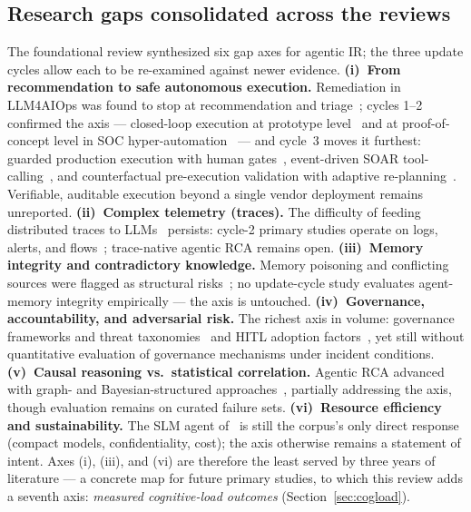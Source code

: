 \documentclass{ieeeaccess}
\begin{document}
\subsection{Research gaps consolidated across the reviews}
\label{sec:gapaxes}
The foundational review synthesized six gap axes for agentic IR; the
three update cycles allow each to be re-examined against newer evidence.
\textbf{(i)~From recommendation to safe autonomous execution.}
Remediation in LLM4AIOps was found to stop at recommendation and
triage~\cite{P05,P15}; cycles 1--2 confirmed the axis --- closed-loop
execution at prototype level~\cite{P22,P32} and at proof-of-concept
level in SOC hyper-automation~\cite{P76} --- and cycle~3 moves it
furthest: guarded production execution with human gates~\cite{P100},
event-driven SOAR tool-calling~\cite{P101}, and counterfactual
pre-execution validation with adaptive re-planning~\cite{P123}.
Verifiable, auditable execution beyond a single vendor deployment
remains unreported.
\textbf{(ii)~Complex telemetry (traces).} The difficulty of feeding
distributed traces to LLMs~\cite{P05} persists: cycle-2 primary studies
operate on logs, alerts, and flows~\cite{P53,P73,P87}; trace-native
agentic RCA remains open.
\textbf{(iii)~Memory integrity and contradictory knowledge.}
Memory poisoning and conflicting sources were flagged as structural
risks~\cite{P01}; no update-cycle study evaluates agent-memory integrity
empirically --- the axis is untouched.
\textbf{(iv)~Governance, accountability, and adversarial risk.}
The richest axis in volume: governance frameworks and threat
taxonomies~\cite{P01,P12,P14,P17,P72,P77} and HITL adoption
factors~\cite{P08,P37}, yet still without quantitative evaluation of
governance mechanisms under incident conditions.
\textbf{(v)~Causal reasoning vs.\ statistical correlation.}
Agentic RCA advanced with graph- and Bayesian-structured
approaches~\cite{P32,P35,P53}, partially addressing the axis, though
evaluation remains on curated failure sets.
\textbf{(vi)~Resource efficiency and sustainability.}
The SLM agent of~\cite{P21} is still the corpus's only direct response
(compact models, confidentiality, cost); the axis otherwise remains a
statement of intent. Axes (i), (iii), and (vi) are therefore the least
served by three years of literature --- a concrete map for future
primary studies, to which this review adds a seventh axis:
\emph{measured cognitive-load outcomes}
(Section~\ref{sec:cogload}).
\end{document}
